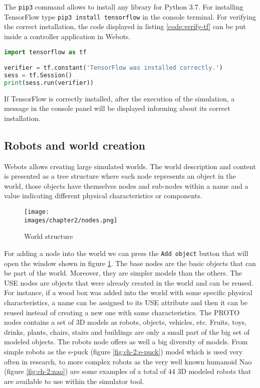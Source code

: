 The \verb|pip3| command allows to install any library for Python 3.7. For installing TensorFlow type \verb|pip3 install tensorflow| in the console terminal. For verifying the correct installation, the code displayed in listing \ref{code:verify-tf} can be put inside a controller application in Webots.

\begin{lstlisting}[language=Python, caption=Verify correct installation of TensorFlow, label=code:verify-tf]
import tensorflow as tf

verifier = tf.constant('TensorFlow was installed correctly.')
sess = tf.Session()
print(sess.run(verifier))
\end{lstlisting}

If TensorFlow is correctly installed, after the execution of the simulation, a message in the console panel will be displayed informing about its correct installation.


\subsection{Robots and world creation}

Webots allows creating large simulated worlds. The world description and content is presented as a tree structure where each node represents an object in the world, those objects have themselves nodes and sub-nodes within a name and a value indicating different physical characteristics or components. 

\begin{figure}[h!]
  \centering
  \texttt{[image: \\images/chapter2/nodes.png]}
  \caption{World structure}
  \label{fig:ch-2:nodes}
\end{figure}

For adding a node into the world we can press the \verb|Add object| button that will open the window shown in figure \ref{fig:ch-2:nodes}. The base nodes are the basic objects that can be part of the world. Moreover, they are simpler models than the others. The USE nodes are objects that were already created in the world and can be reused. For instance, if a wood box was added into the world with some specific physical characteristics, a name can be assigned to its USE attribute and then it can be reused instead of creating a new one with same characteristics. The PROTO nodes contains a set of 3D models as robots, objects, vehicles, etc. Fruits, toys, drinks, plants, chairs, stairs and buildings are only a small part of the big set of modeled objects. The robots node offers as well a big diversity of models. From simple robots as the e-puck (figure \ref{fig:ch-2:e-puck}) model which is used very often in research, to more complex robots as the very well known humanoid Nao (figure \ref{fig:ch-2:nao}) are some examples of a total of 44 3D modeled robots that are available to use within the simulator tool. 

